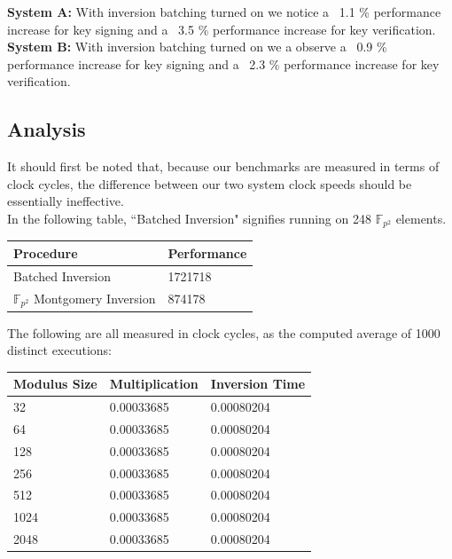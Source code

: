 \textbf{System A:} With inversion batching turned on we notice a ~1.1 \% performance increase for key signing and a ~3.5 \% performance increase for key verification.\\

\textbf{System B:} With inversion batching turned on we a observe a ~0.9 \% performance increase for key signing and a ~2.3 \% performance increase for key verification.\\

\subsection{Analysis}

It should first be noted that, because our benchmarks are measured in terms of clock cycles, the difference between our two system clock speeds should be essentially ineffective. \\

In the following table, ``Batched Inversion" signifies running  on 248 $\mathbb{F}_{p^{2}}$ elements.

\begin{center}
\begin{tabular}{@{}ll@{}}
	\toprule
	Procedure & Performance \\
	\midrule
	Batched Inversion & 1721718\\
	$\mathbb{F}_{p^{2}}$ Montgomery Inversion & 874178\\
	\bottomrule
\end{tabular}
\end{center}

The following are all measured in clock cycles, as the computed average of 1000 distinct executions:

\begin{center}
\begin{tabular}{@{}lll@{}}
	\toprule
	Modulus Size & Multiplication & Inversion Time \\
	\midrule
	32 & 0.00033685 & 0.00080204\\
	64 & 0.00033685 & 0.00080204\\
	128 & 0.00033685 & 0.00080204\\
	256 & 0.00033685 & 0.00080204\\
	512 & 0.00033685 & 0.00080204\\
	1024 & 0.00033685 & 0.00080204\\
	2048 & 0.00033685 & 0.00080204\\
	\bottomrule
\end{tabular}
\end{center}

